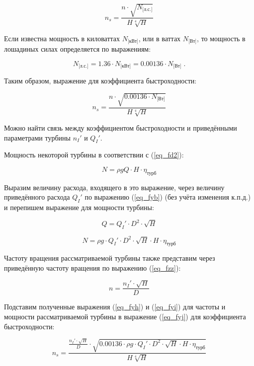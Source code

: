 \begin{equation}
\label{eq_fyf}
   n_s = \frac{n \cdot \sqrt{N_{\text{[л.с.]}}}}{H \sqrt[4]{H}}
\end{equation}


Если известна мощность в киловаттах $N_{\text{[кВт]}}$, или в ваттах $N_{\text{[Вт]}}$, то мощность в лошадиных силах определяется по выражениям:

$$
   N_{\text{[л.с.]}} = 1.36 \cdot N_{\text{[кВт]}} = 0.00136 \cdot N_{\text{[Вт]}} \; .
$$

Таким образом, выражение для коэффициента быстроходности:

\begin{equation}
\label{eq_fyj}
   n_s = \frac{n \cdot \sqrt{0.00136 \cdot N_{\text{[Вт]}}}}{H \sqrt[4]{H}}
\end{equation}



\vspace{1 cm}

Можно найти связь между коэффициентом быстроходности и приведёнными параметрами турбины $n_I'$ и $Q_I'$.

Мощность некоторой турбины в соответствии с (\ref{eq_fd2}):

$$
  N = \rho g Q \cdot H \cdot \eta_{\text{турб}}
$$

Выразим величину расхода, входящего в это выражение, через величину приведённого расхода $Q_I'$ по выражению (\ref{eq_fyb}) (без учёта изменения к.п.д.) и перепишем выражение для мощности турбины:

$$
   Q = Q_I' \cdot D^2 \cdot \sqrt{H}
$$

\begin{equation}
\label{eq_fyh}
   N = \rho g \cdot Q_I' \cdot D^2 \cdot \sqrt{H} \cdot H \cdot \eta_{\text{турб}}
\end{equation}

Частоту вращения рассматриваемой турбины также представим через приведённую частоту вращения по выражению (\ref{eq_fzz}):

\begin{equation}
\label{eq_fyi}
   n = \frac{n_I' \cdot \sqrt{H}}{D}
\end{equation}

Подставим полученные выражения (\ref{eq_fyh}) и (\ref{eq_fyi}) для частоты и мощности рассматриваемой турбины в выражение (\ref{eq_fyj}) для коэффициента быстроходности:

$$
   n_s = \frac{\frac{n_I' \cdot \sqrt{H}}{D} \cdot \sqrt{0.00136 \cdot \rho g \cdot Q_I' \cdot D^2 \cdot \sqrt{H} \cdot H \cdot \eta_{\text{турб}} }}{H \sqrt[4]{H}}
$$

